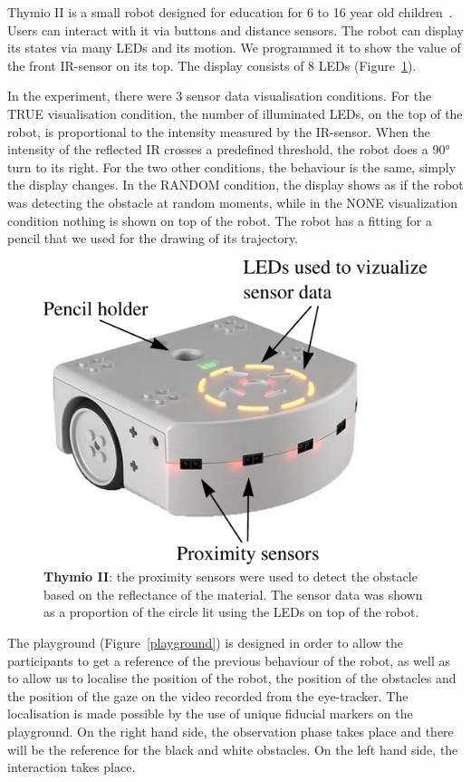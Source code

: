 \documentclass{sig-alternate}
\begin{document}
Thymio II is a small robot designed for education for 6 to 16 year old
children~\cite{magnenat2012programming, riedo2012two}. Users can interact with
it via buttons and distance sensors. The robot can display its states via many
LEDs and its motion. We programmed it to show the value of the front IR-sensor
on its top. The display consists of 8 LEDs (Figure~\ref{thymio}).

In the experiment, there were 3 sensor data visualisation conditions.  For the
{\sf TRUE} visualisation condition, the number of illuminated LEDs, on the top of the
robot, is proportional to the intensity measured by the IR-sensor. When the
intensity of the reflected IR crosses a predefined threshold, the robot does a
90° turn to its right. For the two other conditions, the behaviour is the same,
simply the display changes. In the {\sf RANDOM} condition, the display shows as if the
robot was detecting the obstacle at random moments, while in the {\sf NONE}
visualization condition nothing is shown on top of the robot. The robot has a
fitting for a pencil that we used for the drawing of its trajectory.

\begin{figure}
    \centering
    \includegraphics[width=0.9\linewidth]{thymio}
    \caption{\small \textbf{Thymio II}: the proximity sensors were used to
    detect the obstacle based on the reflectance of the material. The sensor
    data was shown as a proportion of the circle lit using the LEDs on top of the
    robot.}

    \label{thymio}
\end{figure}

The playground (Figure~\ref{playground}) is designed in order to allow the
participants to get a reference of the previous behaviour of the robot, as well
as to allow us to localise the position of the robot, the position of the
obstacles and the position of the gaze on the video recorded from the
eye-tracker. The localisation is made possible by the use of unique fiducial
markers on the playground. On the right hand side, the observation phase takes
place and there will be the reference for the black and white obstacles. On the
left hand side, the interaction takes place.
\end{document}
